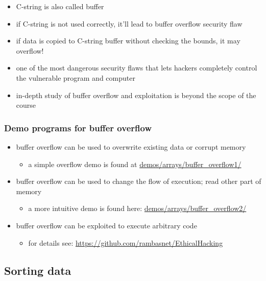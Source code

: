 \documentclass[11pt]{article}
\providecommand{\tightlist}{%
      \setlength{\itemsep}{0pt}\setlength{\parskip}{0pt}}
\begin{document}
\begin{itemize}
\tightlist
\item
  C-string is also called buffer
\item
  if C-string is not used correctly, it'll lead to buffer overflow
  security flaw
\item
  if data is copied to C-string buffer without checking the bounds, it
  may overflow!
\item
  one of the most dangerous security flaws that lets hackers completely
  control the vulnerable program and computer
\item
  in-depth study of buffer overflow and exploitation is beyond the scope
  of the course
\end{itemize}

\hypertarget{demo-programs-for-buffer-overflow}{%
\subsubsection{Demo programs for buffer
overflow}\label{demo-programs-for-buffer-overflow}}

\begin{itemize}
\tightlist
\item
  buffer overflow can be used to overwrite existing data or corrupt
  memory

  \begin{itemize}
  \tightlist
  \item
    a simple overflow demo is found at
    \url{demos/arrays/buffer_overflow1/}
  \end{itemize}
\item
  buffer overflow can be used to change the flow of execution; read
  other part of memory

  \begin{itemize}
  \tightlist
  \item
    a more intuitive demo is found here:
    \url{demos/arrays/buffer_overflow2/}
  \end{itemize}
\item
  buffer overflow can be exploited to execute arbitrary code

  \begin{itemize}
  \tightlist
  \item
    for details see: \url{https://github.com/rambasnet/EthicalHacking}
  \end{itemize}
\end{itemize}

    \hypertarget{sorting-data}{%
\subsection{Sorting data}\label{sorting-data}}
\end{document}

